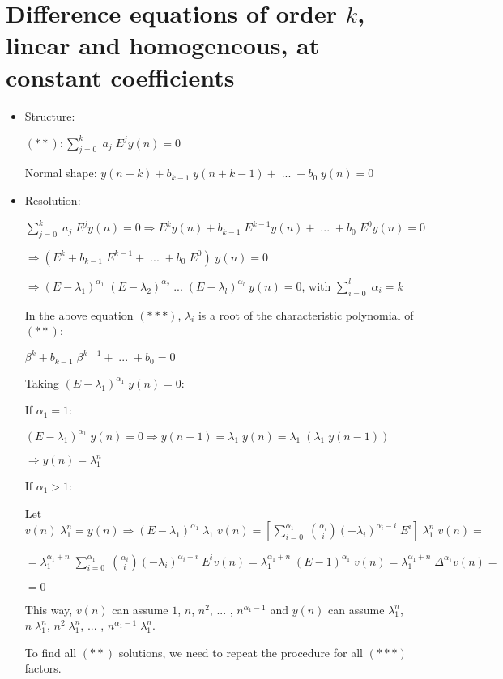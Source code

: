 \documentclass{article}
\begin{document}
\section{Difference equations of order $k$, linear and homogeneous, at constant coefficients}

\begin{itemize}

\item Structure:

$(**): \sum\limits_{j = 0}^{k} \; a_{j} \; E^{j} y(n) = 0$

Normal shape: $y(n + k) + b_{k - 1} \; y(n + k - 1) + \; ... \; + b_{0} \; y(n) = 0$

\item Resolution:

$\sum\limits_{j = 0}^{k} \; a_{j} \; E^{j} y(n) = 0 \Rightarrow E^{k} y(n) + b_{k - 1} \; E^{k - 1} y(n) + \; ... \; + b_{0} \; E^{0} y(n) = 0$

$\Rightarrow (E^{k} + b_{k - 1} \; E^{k - 1} + \; ... \; + b_{0} \; E^{0}) \; y(n) = 0$

$\Rightarrow (E - \lambda_{1})^{\alpha_{1}} \; (E - \lambda_{2})^{\alpha_{2}} \; ... \; (E - \lambda_{l})^{\alpha_{l}} \; y(n) = 0$, with $\sum\limits_{i = 0}^{l} \; \alpha_{i} = k$

In the above equation $(***)$, $\lambda_{i}$ is a root of the characteristic polynomial of $(**)$:

$\beta^{k} + b_{k - 1} \; \beta^{k - 1} + \; ... \; + b_{0} = 0$

Taking $(E - \lambda_{1})^{\alpha_{1}} \; y(n) = 0$:

If $\alpha_{1} = 1$:

$(E - \lambda_{1})^{\alpha_{1}} \; y(n) = 0 \Rightarrow y(n + 1) = \lambda_{1} \; y(n) = \lambda_{1} \; (\lambda_{1} \; y(n - 1))$

$\Rightarrow y(n) = \lambda_{1}^{n}$

If $\alpha_{1} > 1$:

Let $v(n) \; \lambda_{1}^{n} = y(n) \Rightarrow (E - \lambda_{1})^{\alpha_{1}} \; \lambda_{1} \; v(n) = [\sum\limits_{i = 0}^{\alpha_{1}} \; \binom{\alpha_{i}}{i} (-\lambda_{i})^{\alpha_{i} - i} \; E^{i}] \; \lambda_{1}^{n} \; v(n) =$

$= \lambda_{1}^{\alpha_{1} + n} \; \sum\limits_{i = 0}^{\alpha_{1}} \; \binom{\alpha_{i}}{i} (-\lambda_{i})^{\alpha_{i} - i} \; E^{i} v(n) = \lambda_{1}^{\alpha_{1} + n} \; (E - 1)^{\alpha_{1}} \; v(n) = \lambda_{1}^{\alpha_{1} + n} \; \Delta^{\alpha_{1}} v(n) =$

$= 0$

This way, $v(n)$ can assume $1$, $n$, $n^{2}$, ... , $n^{\alpha_{1} - 1}$ and $y(n)$ can assume $\lambda_{1}^{n}$, $n \; \lambda_{1}^{n}$, $n^{2} \; \lambda_{1}^{n}$, ... , $n^{\alpha_{1} - 1} \; \lambda_{1}^{n}$.

To find all $(**)$ solutions, we need to repeat the procedure for all $(***)$ factors.


\end{itemize}
\end{document}
